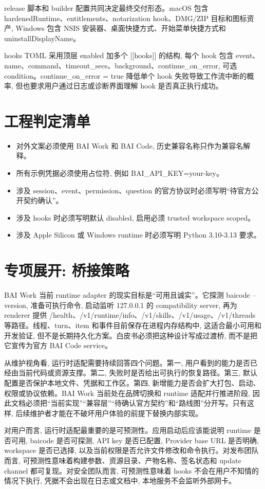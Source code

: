 release 脚本和 builder 配置共同决定最终交付形态。macOS 包含 hardenedRuntime、entitlements、notarization hook、DMG/ZIP 目标和图标资产, Windows 包含 NSIS 安装器、桌面快捷方式、开始菜单快捷方式和 uninstallDisplayName。

hooks TOML 采用顶层 enabled 加多个 [[hooks]] 的结构, 每个 hook 包含 event、name、command、timeout\_secs、background、continue\_on\_error, 可选 condition。continue\_on\_error = true 降低单个 hook 失败导致工作流中断的概率, 但也要求用户通过日志或诊断界面理解 hook 是否真正执行成功。

\section{工程判定清单}
\begin{itemize}
  \item 对外文案必须使用 BAI Work 和 BAI Code, 历史兼容名称只作为兼容名解释。
  \item 所有示例凭据必须使用占位符, 例如 BAI\_API\_KEY=your-key。
  \item 涉及 session、event、permission、question 的官方协议时必须写明“待官方公开契约确认”。
  \item 涉及 hooks 时必须写明默认 disabled, 启用必须 trusted workspace scoped。
  \item 涉及 Apple Silicon 或 Windows runtime 时必须写明 Python 3.10-3.13 要求。
\end{itemize}

\section{专项展开: 桥接策略}
BAI Work 当前 runtime adapter 的现实目标是“可用且诚实”。它探测 baicode --version, 准备可执行命令, 启动监听 127.0.0.1 的 compatibility server, 再为 renderer 提供 /health、/v1/runtime/info、/v1/skills、/v1/usage、/v1/threads 等路径。线程、turn、item 和事件目前保存在进程内存结构中, 这适合最小可用和开发验证, 但不是长期持久化方案。白皮书必须把这种设计写成过渡桥, 而不是把它宣传为官方 BAI Code service。

从维护视角看, 运行时适配需要持续回答四个问题。第一, 用户看到的能力是否已经由当前代码或资源支撑。第二, 失败时是否给出可执行的恢复路径。第三, 默认配置是否保护本地文件、凭据和工作区。第四, 新增能力是否会扩大打包、启动、权限或协议依赖。BAI Work 当前处在品牌切换和 runtime 适配并行推进阶段, 因此文档必须把“当前实现”“兼容层”“待确认官方契约”和“路线图”分开写。只有这样, 后续维护者才能在不破坏用户体验的前提下替换内部实现。

对用户而言, 运行时适配最重要的是可预测性。应用启动后应该能说明 runtime 是否可用, baicode 是否可探测, API key 是否已配置, Provider base URL 是否明确, workspace 是否已选择, 以及当前权限是否允许文件修改和命令执行。对发布团队而言, 可预测性意味着构建参数、资源目录、产物名称、签名状态和 update channel 都可复现。对安全团队而言, 可预测性意味着 hooks 不会在用户不知情的情况下执行, 凭据不会出现在日志或文档中, 本地服务不会监听外部网卡。

